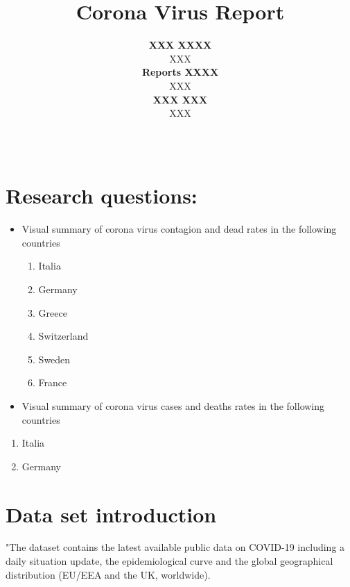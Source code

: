 \documentclass[11pt,a4paper,]{article}
\title{Corona Virus Report}
\author{\sf\Large\textbf{ XXX XXXX}\\ {\sf\large XXX\\[0.5cm]} \sf\Large\textbf{ Reports XXXX}\\ {\sf\large XXX\\[0.5cm]} \sf\Large\textbf{ XXX XXX}\\ {\sf\large XXX\\[0.5cm]}}
\date{\sf\Date~\Month~\Year}
\makeatletter
\def\titlepage{\front{\expandafter{\@title}}{\@author}{\@organization}}
\makeatother
\begin{document}
\titlepage

{
\setcounter{tocdepth}{2}
\tableofcontents
}
\clearpage

\hypertarget{research-questions}{%
\section{Research questions:}\label{research-questions}}

\begin{itemize}
\item
  Visual summary of corona virus contagion and dead rates in the following countries

  \begin{enumerate}
    \item Italia
    \item Germany
    \item Greece
    \item Switzerland 
    \item Sweden
    \item France
  \end{enumerate}
\item
  Visual summary of corona virus cases and deaths rates in the following countries
\end{itemize}

\begin{enumerate}
   \item Italia
   \item Germany
 \end{enumerate}

\hypertarget{data-set-introduction}{%
\section{Data set introduction}\label{data-set-introduction}}

"The dataset contains the latest available public data on COVID-19 including a daily situation update, the epidemiological curve and the global geographical distribution (EU/EEA and the UK, worldwide).
\end{document}
